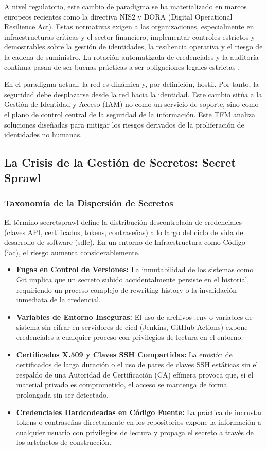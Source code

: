 \documentclass[runningheads]{llncs}
\begin{document}
A nivel regulatorio, este cambio de paradigma se ha materializado en marcos europeos recientes como la directiva NIS2 y DORA (Digital Operational Resilience Act). Estas normativas exigen a las organizaciones, especialmente en infraestructuras críticas y el sector financiero, implementar controles estrictos y demostrables sobre la gestión de identidades, la resiliencia operativa y el riesgo de la cadena de suministro. La rotación automatizada de credenciales y la auditoría continua pasan de ser buenas prácticas a ser obligaciones legales estrictas \parencite{nis2_2022_2555,dora_2022_2554}.

En el paradigma actual, la red es dinámica y, por definición, hostil. Por tanto, la seguridad debe desplazarse desde la red hacia la identidad. Este cambio sitúa a la Gestión de Identidad y Acceso (IAM) no como un servicio de soporte, sino como el plano de control central de la seguridad de la información. Este TFM analiza soluciones diseñadas para mitigar los riesgos derivados de la proliferación de identidades no humanas.

\subsection{La Crisis de la Gestión de Secretos: Secret Sprawl}

\subsubsection{Taxonomía de la Dispersión de Secretos}

El término \gls{secretsprawl} define la distribución descontrolada de credenciales (claves API, certificados, tokens, contraseñas) a lo largo del ciclo de vida del desarrollo de software (\gls{sdlc}). En un entorno de Infraestructura como Código (\gls{iac}), el riesgo aumenta considerablemente.

\begin{itemize}
    \item \textbf{Fugas en Control de Versiones:} La inmutabilidad de los sistemas como Git implica que un secreto subido accidentalmente persiste en el historial, requiriendo un proceso complejo de rewriting history o la invalidación inmediata de la credencial.
    \item \textbf{Variables de Entorno Inseguras:} El uso de archivos .env o variables de sistema sin cifrar en servidores de \gls{cicd} (Jenkins, GitHub Actions) expone credenciales a cualquier proceso con privilegios de lectura en el entorno.
    \item \textbf{Certificados X.509 y Claves SSH Compartidas:} La emisión de certificados de larga duración o el uso de pares de claves SSH estáticas sin el respaldo de una Autoridad de Certificación (CA) efímera provoca que, si el material privado es comprometido, el acceso se mantenga de forma prolongada sin ser detectado.
    \item \textbf{Credenciales Hardcodeadas en Código Fuente:} La práctica de incrustar tokens o contraseñas directamente en los repositorios expone la información a cualquier usuario con privilegios de lectura y propaga el secreto a través de los artefactos de construcción.
\end{itemize}
\end{document}
